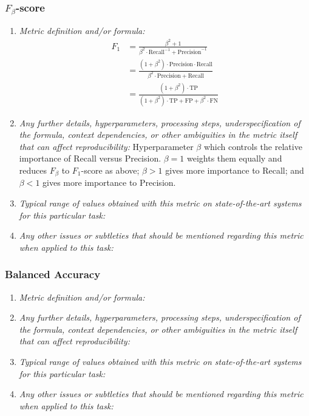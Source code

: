 \documentclass[a4paper,11pt]{article}
\begin{document}
        \subsubsection{$F_\beta$-score}
            \begin{enumerate}[label=\alph*.]
                \item \textit{Metric definition and/or formula:}
                    \begin{align}
                        F_1 &= \frac{\beta^2 + 1}{\beta^2 \cdot \textrm{Recall}^{-1} + \textrm{Precision}^{-1}}\\
                        &= \frac{(1+\beta^2)\cdot\textrm{Precision} \cdot \textrm{Recall}}{\beta^2\cdot\textrm{Precision} + \textrm{Recall}}\\
                        &= \frac{(1+\beta^2)\cdot\textrm{TP}}{(1+\beta^2)\cdot\textrm{TP} + \textrm{FP} + \beta^2\cdot\textrm{FN}}
                    \end{align}
                \bigskip
                \item \textit{Any further details, hyperparameters, processing steps, underspecification of the formula, context dependencies, or other ambiguities in the metric itself that can affect reproducibility:}
                Hyperparameter $\beta$ which controls the relative importance of Recall versus Precision. $\beta=1$ weights them equally and reduces $F_\beta$ to $F_1$-score as above; $\beta>1$ gives more importance to Recall; and $\beta < 1$ gives more importance to Precision.
                \bigskip
                \item \textit{Typical range of values obtained with this metric on state-of-the-art systems for this particular task:}
                \bigskip
                \item \textit{Any other issues or subtleties that should be mentioned regarding this metric when applied to this task:}
                \bigskip
            \end{enumerate}
        \subsubsection{Balanced Accuracy}
            \begin{enumerate}[label=\alph*.]
                \item \textit{Metric definition and/or formula:}
                \bigskip
                \item \textit{Any further details, hyperparameters, processing steps, underspecification of the formula, context dependencies, or other ambiguities in the metric itself that can affect reproducibility:}
                \bigskip
                \item \textit{Typical range of values obtained with this metric on state-of-the-art systems for this particular task:}
                \bigskip
                \item \textit{Any other issues or subtleties that should be mentioned regarding this metric when applied to this task:}
                \bigskip
            \end{enumerate}
\end{document}
